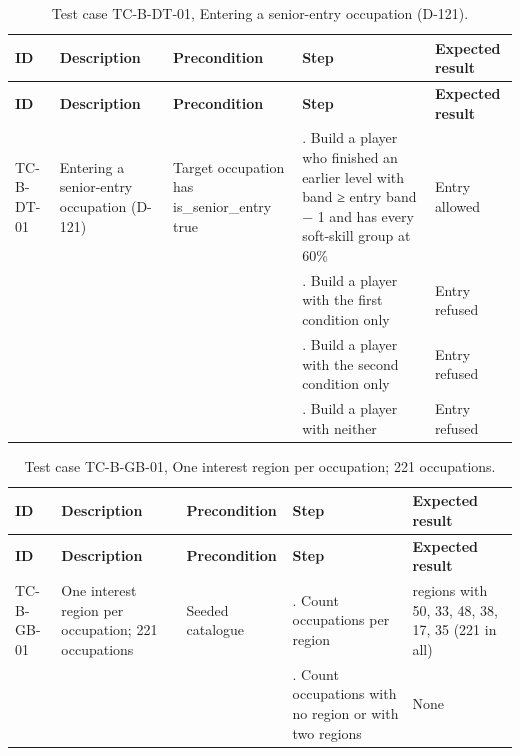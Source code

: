 {\small
\begin{longtable}{|>{\raggedright\arraybackslash}p{}|>{\raggedright\arraybackslash}p{}|>{\raggedright\arraybackslash}p{}|>{\raggedright\arraybackslash}p{}|>{\raggedright\arraybackslash}p{}|}
\caption{Test case TC-B-DT-01, Entering a senior-entry occupation (D-121).} \\
\hline
\textbf{ID} & \textbf{Description} & \textbf{Precondition} & \textbf{Step} & \textbf{Expected result} \\ \hline
\endfirsthead
\hline
\textbf{ID} & \textbf{Description} & \textbf{Precondition} & \textbf{Step} & \textbf{Expected result} \\ \hline
\endhead
TC-B-DT-01 & Entering a senior-entry occupation (D-121) & Target occupation has is\_senior\_entry true & 1. Build a player who finished an earlier level with band ≥ entry band $-$ 1 and has every soft-skill group at 60\% & Entry allowed \\ \hline
 &  &  & 2. Build a player with the first condition only & Entry refused \\ \hline
 &  &  & 3. Build a player with the second condition only & Entry refused \\ \hline
 &  &  & 4. Build a player with neither & Entry refused \\ \hline
\end{longtable}
}

{\small
\begin{longtable}{|>{\raggedright\arraybackslash}p{}|>{\raggedright\arraybackslash}p{}|>{\raggedright\arraybackslash}p{}|>{\raggedright\arraybackslash}p{}|>{\raggedright\arraybackslash}p{}|}
\caption{Test case TC-B-GB-01, One interest region per occupation; 221 occupations.} \\
\hline
\textbf{ID} & \textbf{Description} & \textbf{Precondition} & \textbf{Step} & \textbf{Expected result} \\ \hline
\endfirsthead
\hline
\textbf{ID} & \textbf{Description} & \textbf{Precondition} & \textbf{Step} & \textbf{Expected result} \\ \hline
\endhead
TC-B-GB-01 & One interest region per occupation; 221 occupations & Seeded catalogue & 1. Count occupations per region & 6 regions with 50, 33, 48, 38, 17, 35 (221 in all) \\ \hline
 &  &  & 2. Count occupations with no region or with two regions & None \\ \hline
\end{longtable}
}

